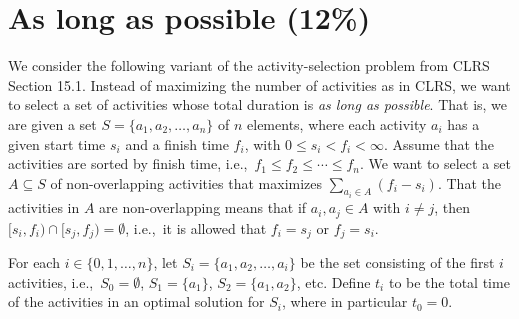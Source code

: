\section{As long as possible (12\%)}

We consider the following variant of the activity-selection problem from CLRS Section 15.1.
Instead of maximizing the number of activities as in CLRS, we want to select a set of activities whose total duration is \emph{as long as possible}.
That is, we are given a set $S=\{a_1,a_2,\ldots,a_n\}$ of $n$ elements, where each activity $a_i$ has a given start time $s_i$ and a finish time $f_i$, with $0\leq s_i<f_i<\infty$.
Assume that the activities are sorted by finish time, i.e.,~$f_1\leq f_2\leq\cdots\leq f_n$.
We want to select a set $A\subseteq S$ of non-overlapping activities that maximizes $\sum_{a_i\in A} (f_i-s_i)$.
That the activities in $A$ are non-overlapping means that if $a_i,a_j\in A$ with $i\neq j$, then $[s_i,f_i)\cap [s_j,f_j)=\emptyset$, i.e.,~it is allowed that $f_i = s_j$ or $f_j = s_i$.



For each $i\in\{0, 1,\ldots,n\}$, let $S_i=\{a_1,a_2,\ldots,a_i\}$ be the set consisting of the first $i$ activities, i.e.,~$S_0=\emptyset$, $S_1=\{a_1\}$, $S_2=\{a_1, a_2\}$, etc.
Define $t_i$ to be the total time of the activities in an optimal solution for $S_i$, where in particular $t_0=0$.



